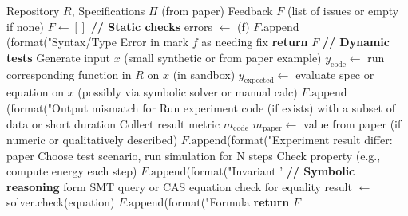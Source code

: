 \documentclass{ieeeaccess}
\begin{document}
\begin{algorithm}[!t]
\small 
\caption{Symbolically-Augmented Code Verification (SACV)}
\label{alg:SACV}
\begin{algorithmic}[1]
\Require Repository $R$, Specifications $\Pi$ (from paper)
\Ensure Feedback $F$ (list of issues or empty if none)
\State $F \gets []$
\State \textbf{// Static checks}
\State errors $\gets$ (f)
\State $F.\text{append}$(format("Syntax/Type Error in %
\State mark $f$ as needing fix
\EndFor
\EndFor
{}
\State \textbf{return} $F$
\EndIf
\State \textbf{// Dynamic tests}
\State Generate input $x$ (small synthetic or from paper example)
\State $y_{\text{code}} \gets$ run corresponding function in $R$ on $x$ (in sandbox)
\State $y_{\text{expected}} \gets$ evaluate spec or equation on $x$ (possibly via symbolic solver or manual calc)
\State $F.\text{append}$(format("Output mismatch for %
\EndIf
{}
\State Run experiment code (if exists) with a subset of data or short duration
\State Collect result metric $m_{\text{code}}$
\State $m_{\text{paper}} \gets$ value from paper (if numeric or qualitatively described)
\State $F.\text{append}$(format("Experiment result differ: paper %
\EndIf
{}
\State Choose test scenario, run simulation for N steps
\State Check property (e.g., compute energy each step)
\State $F.\text{append}$(format("Invariant '%
\EndIf
\EndIf
\EndFor
\State \textbf{// Symbolic reasoning}
\State form SMT query or CAS equation check for equality
\State result $\gets$ solver.check(equation)
\State $F.\text{append}$(format("Formula %
\EndIf
\EndIf
\EndFor
\State \textbf{return} $F$
\end{algorithmic}
\end{algorithm}
\end{document}
